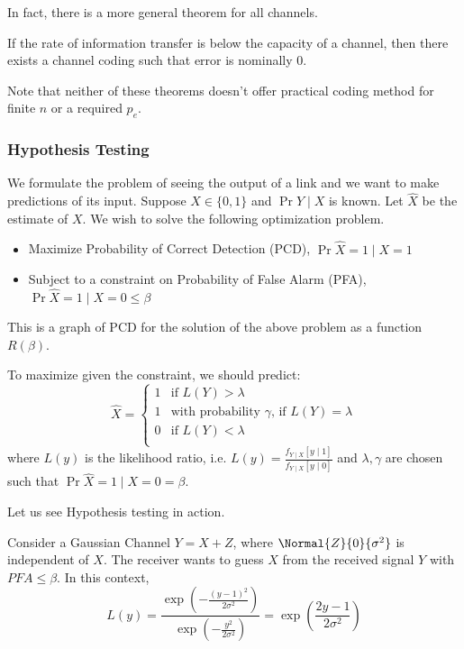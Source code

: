 In fact, there is a more general theorem for all channels.
\begin{theorem}
    If the rate of information transfer is below the capacity of a channel, then there exists a channel coding such that error is nominally 0.
\end{theorem}

Note that neither of these theorems doesn't offer practical coding method for finite $n$ or a required $p_e$.

\subsubsection{Hypothesis Testing}
We formulate the problem of seeing the output of a link and we want to make predictions of its input.
Suppose $X \in \{0, 1\}$ and $\Pr{Y \mid X}$ is known. Let $\hat{X}$ be the estimate of $X$. We wish to solve the following optimization problem.

\begin{itemize}
    \item Maximize Probability of Correct Detection (PCD), $\Pr{\hat{X} = 1 \mid X = 1}$
    \item Subject to a constraint on Probability of False Alarm (PFA), $\Pr{\hat{X} = 1 \mid X = 0} \leq \beta$
\end{itemize}

\begin{definition}
    This is a graph of PCD for the solution of the above problem as a function $R(\beta)$.
\end{definition}

\begin{theorem}
    To maximize given the constraint, we should predict:
    \[ \hat{X} = \begin{cases}
        1 & \text{if } L(Y) > \lambda \\
        1 & \text{with probability $\gamma$, if } L(Y) = \lambda \\
        0 & \text{if } L(Y) < \lambda \\
    \end{cases} \]
    where $L(y)$ is the likelihood ratio, i.e. $L(y) = \frac{f_{Y \mid X}[y \mid 1]}{f_{Y \mid X}[y \mid 0]}$ and $\lambda, \gamma$ are chosen
    such that $\Pr{\hat{X} = 1 \mid X = 0} = \beta$.
\end{theorem}

Let us see Hypothesis testing in action.

\begin{example}
    Consider a Gaussian Channel $Y = X + Z$, where $\Normal{Z}{0}{\sigma^2}$ is independent of $X$.
    The receiver wants to guess $X$ from the received signal $Y$ with $PFA \leq \beta$. In this context,
    \[ L(y) = \frac{\exp(-\frac{(y - 1)^2}{2 \sigma^2})}{\exp(-\frac{y^2}{2 \sigma^2})} = \exp(\frac{2y - 1}{2 \sigma^2})\]
\end{example}
